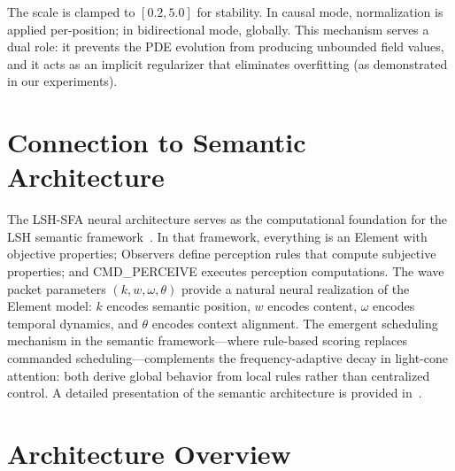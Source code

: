 \documentclass{article}
\begin{document}
The scale is clamped to $[0.2, 5.0]$ for stability. In causal mode, normalization is applied per-position; in bidirectional mode, globally. This mechanism serves a dual role: it prevents the PDE evolution from producing unbounded field values, and it acts as an implicit regularizer that eliminates overfitting (as demonstrated in our experiments).

\section{Connection to Semantic Architecture}

The LSH-SFA neural architecture serves as the computational foundation for the LSH semantic framework~\cite{lsh-three-layer}. In that framework, everything is an Element with objective properties; Observers define perception rules that compute subjective properties; and CMD\_PERCEIVE executes perception computations. The wave packet parameters $(k, w, \omega, \theta)$ provide a natural neural realization of the Element model: $k$ encodes semantic position, $w$ encodes content, $\omega$ encodes temporal dynamics, and $\theta$ encodes context alignment. The emergent scheduling mechanism in the semantic framework---where rule-based scoring replaces commanded scheduling---complements the frequency-adaptive decay in light-cone attention: both derive global behavior from local rules rather than centralized control. A detailed presentation of the semantic architecture is provided in~\cite{lsh-three-layer}.

\section{Architecture Overview}
\end{document}
